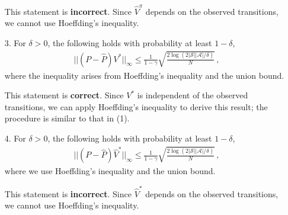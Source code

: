 \begin{itemize}[leftmargin=0.2in]
    \begin{sol}
        This statement is \textbf{incorrect}. Since $\hat{V}^\pi$ depends on the observed transitions, we cannot use Hoeffding's inequality. 
    \end{sol}

    \item[3.] For $\delta > 0$, the following holds with probability at least $1 - \delta$,
    \begin{align*}
    ||(P - \widehat{P}) V^*||_{\infty} 
    \leq 
    \frac{1}{1- \gamma} \sqrt{\frac{2 \log(2|\mathcal{S}||\mathcal{A}|/\delta)}{N}}\,,
    \end{align*}
    where the inequality arises from Hoeffding's inequality and the union bound.

    \begin{sol}
        This statement is \textbf{correct}. Since $V^*$ is independent of the observed transitions, we can apply Hoeffding's inequality to derive this result; the procedure is similar to that in (1).
    \end{sol}

    \item[4.] For $\delta > 0$, the following holds with probability at least $1 - \delta$,
    \begin{align*}
    ||(P - \widehat{P}) \widehat{V}^*||_{\infty} 
    \leq 
    \frac{1}{1- \gamma} \sqrt{\frac{2 \log(2|\mathcal{S}||\mathcal{A}|/\delta)}{N}}\,,
    \end{align*}
    where we use Hoeffding's inequality and the union bound.

    \begin{sol}
        This statement is \textbf{incorrect}. Since $\hat{V}^*$ depends on the observed transitions, we cannot use Hoeffding's inequality. 
    \end{sol}
\end{itemize}